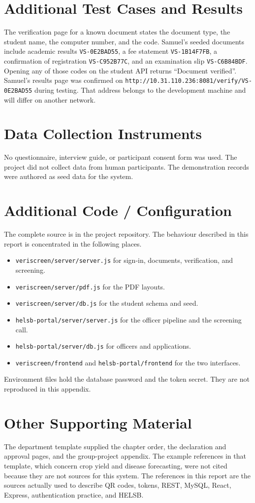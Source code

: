 \documentclass[12pt,a4paper]{report}
\begin{document}
\chapter{Additional Test Cases and Results}
The verification page for a known document states the document type, the student name, the computer number, and the code. Samuel's seeded documents include academic results \texttt{VS-0E2BAD55}, a fee statement \texttt{VS-1B14F7FB}, a confirmation of registration \texttt{VS-C952B77C}, and an examination slip \texttt{VS-C6B84BDF}. Opening any of those codes on the student API returns ``Document verified''. Samuel's results page was confirmed on \texttt{http://10.31.110.236:8081/verify/VS-0E2BAD55} during testing. That address belongs to the development machine and will differ on another network.

\chapter{Data Collection Instruments}
No questionnaire, interview guide, or participant consent form was used. The project did not collect data from human participants. The demonstration records were authored as seed data for the system.

\chapter{Additional Code / Configuration}
The complete source is in the project repository. The behaviour described in this report is concentrated in the following places.
\begin{itemize}
    \item \texttt{veriscreen/server/server.js} for sign-in, documents, verification, and screening.
    \item \texttt{veriscreen/server/pdf.js} for the PDF layouts.
    \item \texttt{veriscreen/server/db.js} for the student schema and seed.
    \item \texttt{helsb-portal/server/server.js} for the officer pipeline and the screening call.
    \item \texttt{helsb-portal/server/db.js} for officers and applications.
    \item \texttt{veriscreen/frontend} and \texttt{helsb-portal/frontend} for the two interfaces.
\end{itemize}
Environment files hold the database password and the token secret. They are not reproduced in this appendix.

\chapter{Other Supporting Material}
The department template supplied the chapter order, the declaration and approval pages, and the group-project appendix. The example references in that template, which concern crop yield and disease forecasting, were not cited because they are not sources for this system. The references in this report are the sources actually used to describe QR codes, tokens, REST, MySQL, React, Express, authentication practice, and HELSB.
\end{document}
